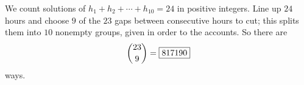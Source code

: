 We count solutions of $h_1+h_2+\cdots+h_{10}=24$ in positive integers. Line up $24$ hours and choose $9$ of the $23$ gaps between consecutive hours to cut; this splits them into $10$ nonempty groups, given in order to the accounts. So there are
\[\dbinom{23}{9}=\boxed{817190}\]
ways.
